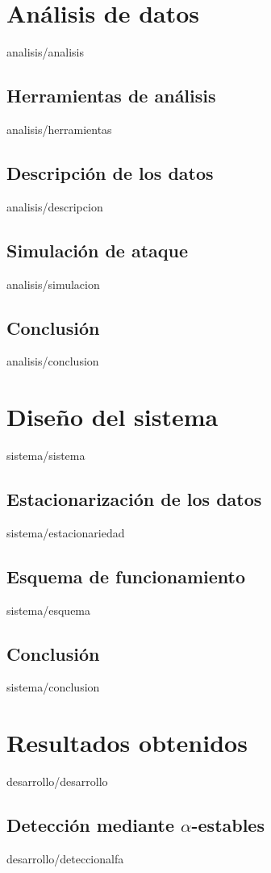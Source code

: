\documentclass[epsbased,copyright,final,printable,covers,extendedindex,firstnumbered,tfg,gnuplot]{tfgtfmthesisuam}
\begin{document}
\chapter{Análisis de datos\label{CAP:ANALISIS}}{analisis/analisis}
  \section{Herramientas de análisis\label{SEC:HERRAMIENTAS}}{analisis/herramientas}
  \section{Descripción de los datos\label{SEC:DESCRIPCION}}{analisis/descripcion}
  \section{Simulación de ataque\label{SEC:SIMULACION}}{analisis/simulacion}
  \section{Conclusión\label{SEC:ADCONCLUSION}}{analisis/conclusion}

\chapter{Diseño del sistema\label{CAP:SISTEMA}}{sistema/sistema}
  \section{Estacionarización de los datos\label{SEC:ESTACIONARIEDAD}}{sistema/estacionariedad}
  \section{Esquema de funcionamiento\label{SEC:ESQUEMA}}{sistema/esquema}
  \section{Conclusión\label{SEC:SDCONCLUSION}}{sistema/conclusion}

\chapter{Resultados obtenidos\label{CAP:DESARROLLO}}{desarrollo/desarrollo}
\section{Detección mediante $\alpha$-estables\label{SEC:DETECCIONALFA}}{desarrollo/deteccionalfa}
\end{document}

